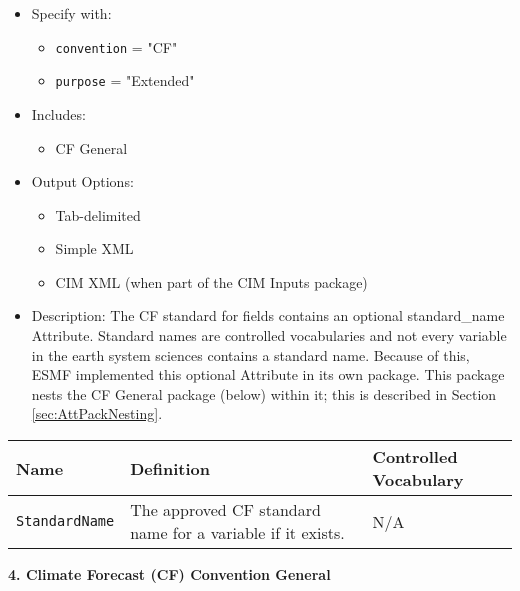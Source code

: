 \begin{itemize}
    \item Specify with:
    \begin{itemize}
        \item {\tt convention} = "CF"
        \item {\tt purpose} = "Extended"
    \end{itemize}
    \item Includes:
    \begin{itemize}
        \item CF General
    \end{itemize}
    \item Output Options:
    \begin{itemize}
        \item Tab-delimited
        \item Simple XML
        \item CIM XML (when part of the CIM Inputs package)
    \end{itemize}
    \item Description: The CF standard for fields contains an optional standard\_name Attribute. Standard names are controlled vocabularies and not every variable in the earth system sciences contains a standard name. Because of this, ESMF implemented this optional Attribute in its own package. This package nests the CF General package (below) within it; this is described in Section \ref{sec:AttPackNesting}.
\end{itemize}

\begin{tabular}{|p{5cm}|p{5cm}|p{35mm}|}
    \hline\hline
    {\bf Name } & {\bf Definition} & {\bf Controlled Vocabulary} \\
    \hline\hline
    {\tt StandardName} & The approved CF standard name for a variable if it exists. &  N/A\\
    \hline\hline
\end{tabular}

\vspace{.20in}

{\bf 4. Climate Forecast (CF) Convention General}

